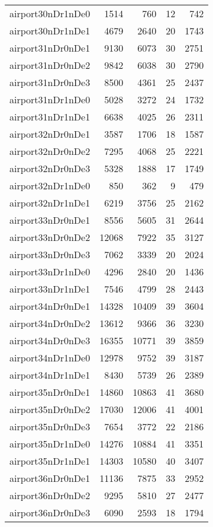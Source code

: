 \begin{tabular}{lrrrr}
airport30nDr1nDe0 & 1514 & 760 & 12 & 742 \\
airport30nDr1nDe1 & 4679 & 2640 & 20 & 1743 \\
airport31nDr0nDe1 & 9130 & 6073 & 30 & 2751 \\
airport31nDr0nDe2 & 9842 & 6038 & 30 & 2790 \\
airport31nDr0nDe3 & 8500 & 4361 & 25 & 2437 \\
airport31nDr1nDe0 & 5028 & 3272 & 24 & 1732 \\
airport31nDr1nDe1 & 6638 & 4025 & 26 & 2311 \\
airport32nDr0nDe1 & 3587 & 1706 & 18 & 1587 \\
airport32nDr0nDe2 & 7295 & 4068 & 25 & 2221 \\
airport32nDr0nDe3 & 5328 & 1888 & 17 & 1749 \\
airport32nDr1nDe0 & 850 & 362 & 9 & 479 \\
airport32nDr1nDe1 & 6219 & 3756 & 25 & 2162 \\
airport33nDr0nDe1 & 8556 & 5605 & 31 & 2644 \\
airport33nDr0nDe2 & 12068 & 7922 & 35 & 3127 \\
airport33nDr0nDe3 & 7062 & 3339 & 20 & 2024 \\
airport33nDr1nDe0 & 4296 & 2840 & 20 & 1436 \\
airport33nDr1nDe1 & 7546 & 4799 & 28 & 2443 \\
airport34nDr0nDe1 & 14328 & 10409 & 39 & 3604 \\
airport34nDr0nDe2 & 13612 & 9366 & 36 & 3230 \\
airport34nDr0nDe3 & 16355 & 10771 & 39 & 3859 \\
airport34nDr1nDe0 & 12978 & 9752 & 39 & 3187 \\
airport34nDr1nDe1 & 8430 & 5739 & 26 & 2389 \\
airport35nDr0nDe1 & 14860 & 10863 & 41 & 3680 \\
airport35nDr0nDe2 & 17030 & 12006 & 41 & 4001 \\
airport35nDr0nDe3 & 7654 & 3772 & 22 & 2186 \\
airport35nDr1nDe0 & 14276 & 10884 & 41 & 3351 \\
airport35nDr1nDe1 & 14303 & 10580 & 40 & 3407 \\
airport36nDr0nDe1 & 11136 & 7875 & 33 & 2952 \\
airport36nDr0nDe2 & 9295 & 5810 & 27 & 2477 \\
airport36nDr0nDe3 & 6090 & 2593 & 18 & 1794 \\

\end{tabular}

